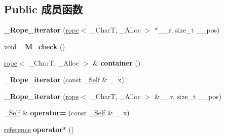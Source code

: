 \subsection*{Public 成员函数}
\begin{DoxyCompactItemize}
\item 
\mbox{\label{class___rope__iterator_ac669e4effc3fc3d34717d02b5e9a651a}} 
{\bfseries \+\_\+\+Rope\+\_\+iterator} (\hyperlink{classrope}{rope}$<$ \+\_\+\+CharT, \+\_\+\+Alloc $>$ $\ast$\+\_\+\+\_\+r, size\+\_\+t \+\_\+\+\_\+pos)
\item 
\mbox{\label{class___rope__iterator_afa0765cc10c238838425b9ea39dc5f96}} 
\hyperlink{interfacevoid}{void} {\bfseries \+\_\+\+M\+\_\+check} ()
\item 
\mbox{\label{class___rope__iterator_acf7d1d9440fb9f73815ee7c6d98b8924}} 
\hyperlink{classrope}{rope}$<$ \+\_\+\+CharT, \+\_\+\+Alloc $>$ \& {\bfseries container} ()
\item 
\mbox{\label{class___rope__iterator_afb7a71084e5ebac2f26c83214cb011a7}} 
{\bfseries \+\_\+\+Rope\+\_\+iterator} (const \hyperlink{class___rope__iterator__base}{\+\_\+\+Self} \&\+\_\+\+\_\+x)
\item 
\mbox{\label{class___rope__iterator_a20d3990310469000e4244f5885ae820b}} 
{\bfseries \+\_\+\+Rope\+\_\+iterator} (\hyperlink{classrope}{rope}$<$ \+\_\+\+CharT, \+\_\+\+Alloc $>$ \&\+\_\+\+\_\+r, size\+\_\+t \+\_\+\+\_\+pos)
\item 
\mbox{\label{class___rope__iterator_aeea19f08a2a5a69b5a9bde878913ac6b}} 
\hyperlink{class___rope__iterator__base}{\+\_\+\+Self} \& {\bfseries operator=} (const \hyperlink{class___rope__iterator__base}{\+\_\+\+Self} \&\+\_\+\+\_\+x)
\item 
\mbox{\label{class___rope__iterator_a83ccff63908c6c59c723310f654c3146}} 
\hyperlink{class___rope__char__ref__proxy}{reference} {\bfseries operator$\ast$} ()
\item 
\mbox{\label{class___rope__iterator_a5acbd793e657b4fa7e42385a0282f1c0}} 

\end{DoxyCompactItemize}
